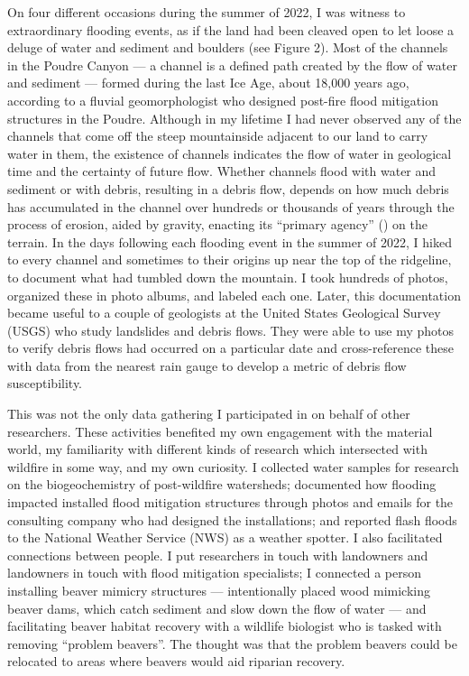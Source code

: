 \documentclass[
]{article}
\begin{document}
On four different occasions during the summer of 2022, I was witness to extraordinary flooding events, as if the land had been cleaved open to let loose a deluge of water and sediment and boulders (see Figure 2). Most of the channels in the Poudre Canyon --- a channel is a defined path created by the flow of water and sediment --- formed during the last Ice Age, about 18,000 years ago, according to a fluvial geomorphologist who designed post-fire flood mitigation structures in the Poudre. Although in my lifetime I had never observed any of the channels that come off the steep mountainside adjacent to our land to carry water in them, the existence of channels indicates the flow of water in geological time and the certainty of future flow. Whether channels flood with water and sediment or with debris, resulting in a debris flow, depends on how much debris has accumulated in the channel over hundreds or thousands of years through the process of erosion, aided by gravity, enacting its ``primary agency'' () on the terrain. In the days following each flooding event in the summer of 2022, I hiked to every channel and sometimes to their origins up near the top of the ridgeline, to document what had tumbled down the mountain. I took hundreds of photos, organized these in photo albums, and labeled each one. Later, this documentation became useful to a couple of geologists at the United States Geological Survey (USGS) who study landslides and debris flows. They were able to use my photos to verify debris flows had occurred on a particular date and cross-reference these with data from the nearest rain gauge to develop a metric of debris flow susceptibility.

This was not the only data gathering I participated in on behalf of other researchers. These activities benefited my own engagement with the material world, my familiarity with different kinds of research which intersected with wildfire in some way, and my own curiosity. I collected water samples for research on the biogeochemistry of post-wildfire watersheds; documented how flooding impacted installed flood mitigation structures through photos and emails for the consulting company who had designed the installations; and reported flash floods to the National Weather Service (NWS) as a weather spotter. I also facilitated connections between people. I put researchers in touch with landowners and landowners in touch with flood mitigation specialists; I connected a person installing beaver mimicry structures --- intentionally placed wood mimicking beaver dams, which catch sediment and slow down the flow of water --- and facilitating beaver habitat recovery with a wildlife biologist who is tasked with removing ``problem beavers''. The thought was that the problem beavers could be relocated to areas where beavers would aid riparian recovery.
\end{document}
